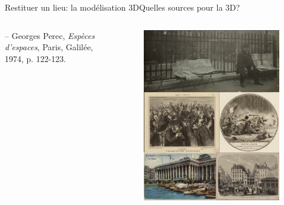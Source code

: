 \documentclass[8pt]{beamer}
\begin{document}
\begin{frame}{Restituer un lieu: la modélisation 3D}{Quelles sources pour la 3D?}
\begin{columns}[c]
\begin{column}{0.5\textwidth}
			\normalsize
			-- Georges Perec, \textit{Espèces d’espaces}, Paris, Galilée, 1974, p. 122-123.
		\end{column}
		\begin{column}{0.5\textwidth}
			\begin{figure}
				\includegraphics[width=\textwidth]{includes/c_slide0.png}
			\end{figure}
		\end{column}
	\end{columns}
\end{frame}
\end{document}
